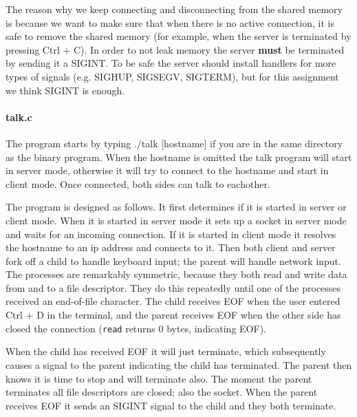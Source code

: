 \documentclass[a4paper,10pt]{article}
\begin{document}
The reason why we keep connecting and disconnecting from the shared
memory is because we want to make sure that when there is no active
connection, it is safe to remove the shared memory (for example, when
the server is terminated by pressing Ctrl + C). In order to not leak
memory the server \textbf{must} be terminated by sending it a
SIGINT. To be safe the server should install handlers for more types of
signals (e.g. SIGHUP, SIGSEGV, SIGTERM), but for this assignment we
think SIGINT is enough.

\paragraph{talk.c} The program starts by typing ./talk [hostname] if
you are in the same directory as the binary program. When the hostname
is omitted the talk program will start in server mode, otherwise it
will try to connect to the hostname and start in client mode. Once
connected, both sides can talk to eachother.

The program is designed as follows. It first determines if it is
started in server or client mode. When it is started in server mode it
sets up a socket in server mode and waits for an incoming
connection. If it is started in client mode it resolves the hostname
to an ip address and connects to it. Then both client and server fork
off a child to handle keyboard input; the parent will handle network
input. The processes are remarkably symmetric, because they both read
and write data from and to a file descriptor. They do this repeatedly
until one of the processes received an end-of-file character. The
child receives EOF when the user entered Ctrl + D in the terminal, and
the parent receives EOF when the other side has closed the connection
(\texttt{read} returns 0 bytes, indicating EOF).

When the child has received EOF it will just terminate, which
subsequently causes a signal to the parent indicating the child has
terminated. The parent then knows it is time to stop and will
terminate also. The moment the parent terminates all file descriptors
are closed; also the socket. When the parent receives EOF it sends an
SIGINT signal to the child and they both terminate.
\end{document}
